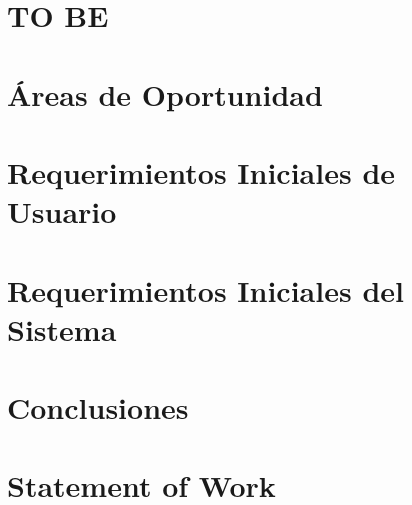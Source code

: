 \section{TO BE}

\section{Áreas de Oportunidad}

\section{Requerimientos Iniciales de Usuario}

\section{Requerimientos Iniciales del Sistema}

\section{Conclusiones}

\section{Statement of Work}